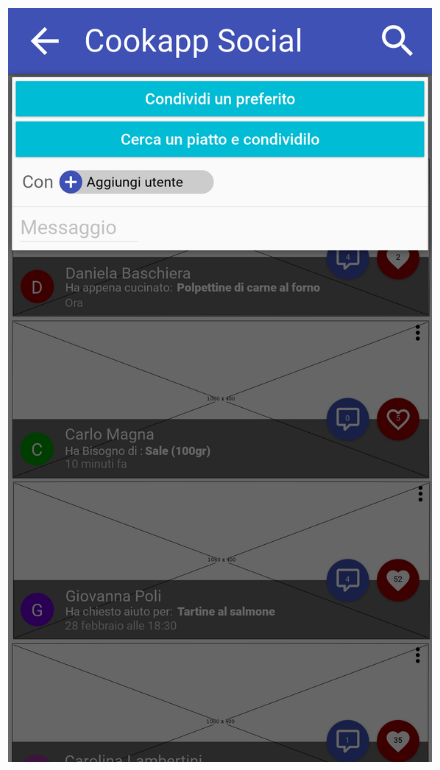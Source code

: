 \begin{figure}[H]
\begin{minipage}{.49\textwidth}
		\includegraphics[width=\textwidth]{img/wireframe/condividi_ricetta_social.png}
	\end{minipage}
\end{figure}
